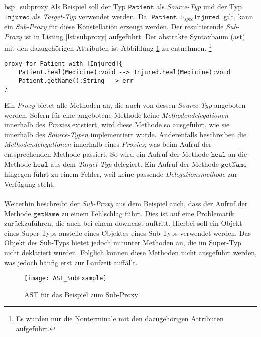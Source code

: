 \begin{example}{bsp_subproxy}
Als Beispiel soll  der Typ $\texttt{Patient}$ als \emph{Source-Typ} und der Typ $\texttt{Injured}$ als \emph{Target-Typ} verwendet werden. Da $\texttt{Patient} \Rightarrow_{spec} \texttt{Injured}$ gilt, kann ein \emph{Sub-Proxy} für diese Konstellation erzeugt werden. Der resultierende \emph{Sub-Proxy} ist in Listing \ref{lst:subproxy} aufgeführt. Der abstrakte Syntaxbaum (\acrshort{ast}) mit den dazugehörigen Attributen ist Abbildung \ref{fig:ASTSUB} zu entnehmen. \footnote{Es wurden nur die Nonterminale mit den dazugehörigen Attributen aufgeführt.}
\begin{lstlisting}[style = dsl, caption = Sub-Proxy für Patient, captionpos = b, label = lst:subproxy]
proxy for Patient with [Injured]{
	Patient.heal(Medicine):void --> Injured.heal(Medicine):void
	Patient.getName():String --> err
}
\end{lstlisting}
\end{example}
Ein \emph{Proxy} bietet alle Methoden an, die auch von dessen \emph{Source-Typ} angeboten werden. Sofern für eine angebotene Methode keine \emph{Methodendelegationen} innerhalb des \emph{Proxies} existiert, wird diese Methode so ausgeführt, wie sie innerhalb des \emph{Source-Typen} implementiert wurde. Anderenfalls beschreiben die \emph{Methodendelegationen} innerhalb eines \emph{Proxies}, was beim Aufruf der entsprechenden Methode passiert. So wird ein Aufruf der Methode $\texttt{heal}$ an die Methode $\texttt{heal}$ aus dem \emph{Target-Typ} delegiert. Ein Aufruf der Methode $\texttt{getName}$ hingegen führt zu einem Fehler, weil keine passende \emph{Delegationsmethode} zur Verfügung steht.
\\\\
Weiterhin beschreibt der \emph{Sub-Proxy} aus dem Beispiel auch, dass der Aufruf der Methode $\texttt{getName}$ zu einem Fehlschlag führt. Dies ist auf eine Problematik zurückzuführen, die auch bei einem \Gls{downcast} auftritt. Hierbei soll ein Objekt eines Super-Typs anstelle eines Objektes eines Sub-Typs verwendet werden. Das Objekt des Sub-Typs bietet jedoch mitunter Methoden an, die im Super-Typ nicht deklariert wurden. Folglich können diese Methoden nicht ausgeführt werden, was jedoch häufig erst zur Laufzeit auffällt.
\begin{figure}[H]
\texttt{[image: AST\_SubExample]}
\caption{AST für das Beispiel zum Sub-Proxy}
\label{fig:ASTSUB}
\end{figure}

